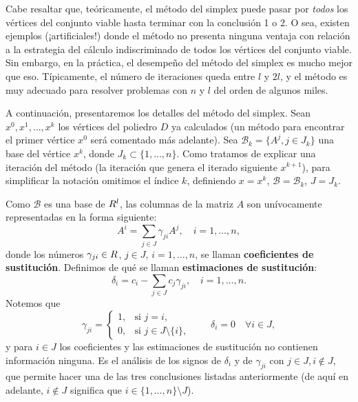 Cabe resaltar que, teóricamente, el método del simplex puede pasar por \textit{todos} los vértices del conjunto viable hasta terminar con la conclusión 1 o 2. O sea, existen ejemplos (¡artificiales!) donde el método no presenta ninguna ventaja con relación a la estrategia del cálculo indiscriminado de todos los vértices del conjunto viable. Sin embargo, en la práctica, el desempeño del método del simplex es mucho mejor que eso. Típicamente, el número de iteraciones queda entre $l$ y $2l$, y el método es muy adecuado para resolver problemas con $n$ y $l$ del orden de algunos miles.

A continuación, presentaremos los detalles del método del simplex. Sean $x^0, x^1, \dots, x^k$ los vértices del poliedro $D$ ya calculados (un método para encontrar el primer vértice $x^0$ será comentado más adelante). Sea $\mathcal{B}_k = \{ A^j, j \in J_k \}$ una base del vértice $x^k$, donde $J_k \subset \{1, \dots, n\}$. Como tratamos de explicar una iteración del método (la iteración que genera el iterado siguiente $x^{k+1}$), para simplificar la notación omitimos el índice $k$, definiendo $x = x^k$, $\mathcal{B} = \mathcal{B}_k$, $J = J_k$.

Como $\mathcal{B}$ es una base de $R^l$, las columnas de la matriz $A$ son unívocamente representadas en la forma siguiente:
\begin{equation}
    A^i = \sum_{j \in J} \gamma_{ji} A^j, \quad i = 1, \dots, n,
    \label{v2:eq:6.19}
\end{equation}
donde los números $\gamma_{ji} \in R$, $j \in J$, $i = 1, \dots, n$, se llaman \textbf{coeficientes de sustitución}. Definimos de qué se llaman \textbf{estimaciones de sustitución}:
\begin{equation}
    \delta_i = c_i - \sum_{j \in J} c_j \gamma_{ji}, \quad i = 1, \dots, n.
    \label{v2:eq:6.20}
\end{equation}
Notemos que
\[
    \gamma_{ji} = \begin{cases} 1, & \text{si } j = i, \\ 0, & \text{si } j \in J \setminus \{i\}, \end{cases} \qquad \delta_i = 0 \quad \forall i \in J,
\]
y para $i \in J$ los coeficientes y las estimaciones de sustitución no contienen información ninguna. Es el análisis de los signos de $\delta_i$ y de $\gamma_{ji}$ con $j \in J, i \notin J$, que permite hacer una de las tres conclusiones listadas anteriormente (de aquí en adelante, $i \notin J$ significa que $i \in \{1, \dots, n\} \setminus J$).

